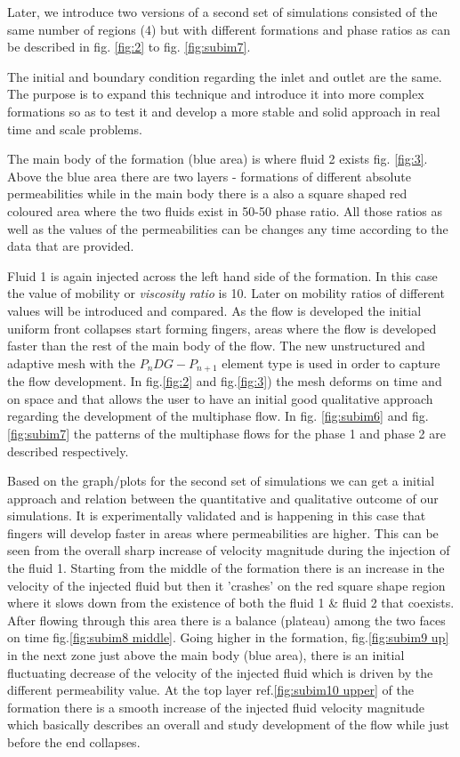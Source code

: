 \documentclass[preprint,authoryear,12pt]{elsarticle}
\begin{document}
Later, we introduce two versions of a second set of simulations consisted of the same number of regions (4) but with different formations and phase ratios as can be described in fig. \ref{fig:2} to fig. \ref{fig:subim7}. 

The initial and boundary condition regarding the inlet and outlet are the same. The purpose is to expand this technique and introduce it into more complex formations so as to test it and develop a more stable and solid approach in real time and scale problems. 

The main body of the formation (blue area) is where fluid 2 exists fig. \ref{fig:3}. Above the blue area there are two layers - formations of different absolute permeabilities while in the main body there is a also a square shaped red coloured area where the two fluids exist in 50-50 phase ratio. All those ratios as well as the values of the permeabilities can be changes any time according to the data that are provided.

Fluid 1 is again injected across the left hand side of the formation. In this case the value of mobility or \textit{viscosity ratio} is 10. Later on mobility ratios of different values will be introduced and compared. As the flow is developed the initial uniform front collapses start forming fingers, areas where the flow is developed faster than the rest of the main body of the flow. The new unstructured and adaptive mesh with the $P_{n}DG-P_{n+1}$ element type is used in order to capture the flow development. In fig.\ref{fig:2} and fig.\ref{fig:3}) the mesh deforms on time and on space and that allows the user to have an initial good qualitative approach regarding the development of the multiphase flow. In fig. \ref{fig:subim6} and fig. \ref{fig:subim7} the patterns of the multiphase flows for the phase 1 and phase 2 are described respectively.

Based on the graph/plots for the second set of simulations we can get a initial approach and relation between the quantitative and qualitative outcome of our simulations. It is experimentally validated and is happening in this case that fingers will develop faster in areas where permeabilities are higher. This can be seen from the overall sharp increase of velocity magnitude during the injection of the fluid 1. Starting from the middle of the formation there is an increase in the velocity of the injected fluid but then it 'crashes' on the red square shape region where it slows down from the existence of both the fluid 1 \& fluid 2 that coexists. After flowing through this area there is a balance (plateau) among the two faces on time fig.\ref{fig:subim8 middle}. Going higher in the formation, fig.\ref{fig:subim9 up} in the next zone just above the main body (blue area), there is an initial fluctuating decrease  of the velocity of the injected fluid which is driven by the different permeability value. At the top layer ref.\ref{fig:subim10 upper} of the formation there is a smooth increase of the injected fluid velocity magnitude which basically describes an overall and study development of the flow while just before the end collapses. 
\end{document}
